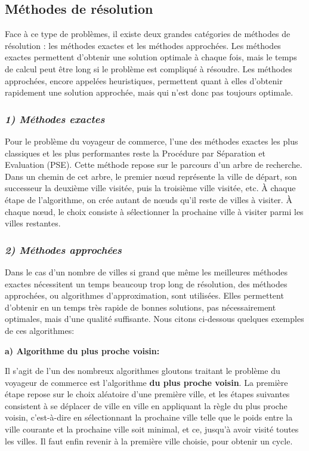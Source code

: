 \documentclass[12pt, openany]{report}
\begin{document}
\setlength{\parindent}{1cm}\subsection{Méthodes de résolution}
Face à ce type de problèmes, il existe deux grandes catégories de méthodes de résolution : les méthodes exactes et les méthodes approchées. Les méthodes exactes permettent d’obtenir une solution optimale à chaque fois, mais le temps de calcul peut être long si le problème est compliqué à résoudre. Les méthodes approchées, encore appelées heuristiques, permettent quant à elles d’obtenir rapidement une solution approchée, mais qui n’est donc pas toujours optimale.
\setlength{\parindent}{1cm} \subsubsection{\textit{1)  \quad	Méthodes exactes}}
Pour le problème du voyageur de commerce, l’une des méthodes exactes les plus classiques et les plus performantes reste la Procédure par Séparation et Evaluation (PSE). Cette méthode repose sur le parcours d’un arbre de recherche. Dans un chemin de cet arbre, le premier nœud représente la ville de départ, son successeur la deuxième ville visitée, puis la troisième ville visitée, etc. À chaque étape de l’algorithme, on crée autant de nœuds qu’il reste de villes à visiter. À chaque nœud, le choix consiste à sélectionner la prochaine ville à visiter parmi les villes restantes.
\setlength{\parindent}{1cm} \subsubsection{\textit{2)  \quad	Méthodes approchées}}
Dans le cas d’un nombre de villes si grand que même les meilleures méthodes exactes nécessitent un temps beaucoup trop long de résolution, des méthodes approchées, ou algorithmes d’approximation, sont utilisées. Elles permettent d’obtenir en un temps très rapide de bonnes solutions, pas nécessairement optimales, mais d’une qualité suffisante.
Nous citons ci-dessous quelques exemples de ces algorithmes:

\quad \textbf{a) Algorithme du plus proche voisin:} 

Il s'agit de l'un des nombreux algorithmes gloutons traitant le problème du voyageur de commerce est l'algorithme \textbf{du plus proche voisin}. La première étape repose sur le choix aléatoire d’une première ville, et les étapes suivantes consistent à se déplacer de ville en ville en appliquant la règle du plus proche voisin, c’est-à-dire en sélectionnant la prochaine ville telle que le poids entre la ville courante et la prochaine ville soit minimal, et ce, jusqu’à avoir visité toutes les villes. Il faut enfin revenir à la première ville choisie, pour obtenir un cycle.
\end{document}
